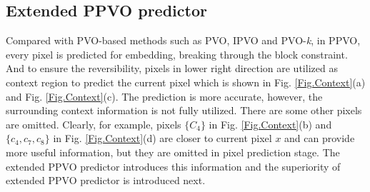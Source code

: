 \documentclass[review,3p,10pt,sort&compress]{elsarticle}
\begin{document}
\subsection{Extended PPVO predictor}\label{sec:3.1}
Compared with PVO-based methods such as PVO\cite{Li2013PVO}, IPVO\cite{Peng2014IPVO} and PVO-\emph{k}\cite{Ou2014PVOk}, in PPVO, every pixel is predicted for embedding, breaking through the block constraint. And to ensure the reversibility, pixels in lower right direction are utilized as context region to predict the current pixel which is shown in Fig. \ref{Fig.Context}(a) and Fig. \ref{Fig.Context}(c). The prediction is more accurate, however, the surrounding context information is not fully utilized. There are some other pixels are omitted. Clearly, for example, pixels $\{C_4\}$ in Fig. \ref{Fig.Context}(b) and $\{c_{4}, c_{7}, c_{8}\}$ in Fig. \ref{Fig.Context}(d) are closer to current pixel $x$ and can provide more useful information, but they are omitted in pixel prediction stage. The extended PPVO predictor introduces this information and the superiority of extended PPVO predictor is introduced next.
\end{document}
